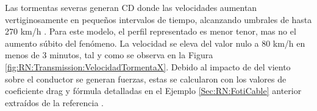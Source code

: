 \begingroup
\begin{figure}[htbp]
	\centering
    \label{fig:RN:Transmission:ForceVelTormenta}
\end{figure}
\endgroup

Las tormentas severas generan CD donde las velocidades aumentan vertiginosamente en pequeños intervalos de tiempo, alcanzando umbrales de hasta 270 km/h \cite{fujita1985downburst}. Para este modelo, el perfil representado es menor tenor, mas no el aumento súbito del fenómeno. La velocidad se eleva del valor nulo a 80 km/h en menos de 3 minutos, tal y como se observa en la Figura \ref{fig:RN:Transmission:VelocidadTormentaX}. Debido al impacto de del viento sobre el conductor se generan fuerzas, estas se calcularon con los valores de coeficiente drag y fórmula detalladas en el Ejemplo \ref{Sec:RN:FotiCable} anterior extraídos de la referencia \textcite{Foti2016}.


